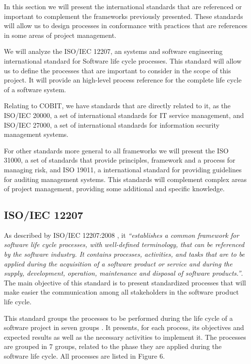 In this section we will present the international standards that are referenced or important to complement the frameworks previously presented. These standards will allow us to design processes in conformance with practices that are references in some areas of project management.\par
We will analyze the ISO/IEC 12207\cite{ISO12207}, an systems and software engineering international standard for Software life cycle processes. This standard will allow us to define the processes that are important to consider in the scope of this project. It will provide an high-level process reference for the complete life cycle of a software system.\par
Relating to COBIT, we have standards that are directly related to it, as the ISO/IEC 20000\cite{ISO20000-1,ISO20000-2,ISO20000-3,ISO20000-4,ISO20000-5}, a set of international standards for IT service management, and ISO/IEC 27000\cite{ISO27000}, a set of international standards for information security management systems.\par
For other standards more general to all frameworks we will present the ISO 31000\cite{ISO31000,IEC31010}, a set of standards that provide principles, framework and a process for managing risk, and ISO 19011\cite{ISO19011}, a international standard for providing guidelines for auditing management systems. This standards will complement complex areas of project management, providing some additional and specific knowledge.

\subsection{ISO/IEC 12207}

As described by ISO/IEC 12207:2008 \cite{ISO12207}, it \textit{``establishes a common framework for software life cycle processes, with well-defined terminology, that can be referenced by the software industry. It contains processes, activities, and tasks that are to be applied during the acquisition of a software product or service and during the supply, development, operation, maintenance and disposal of software products.''}. The main objective of this standard is to present standardized processes that will make easier the communication among all stakeholders in the software product life cycle.\par
This standard groups the processes to be performed during the life cycle of a software project in seven groups . It presents, for each process, its objectives and expected results as well as the necessary activities to implement it. The processes are grouped in 7 groups, related to the phase they are applied during the software life cycle. All processes are listed in Figure 6.\par
 

